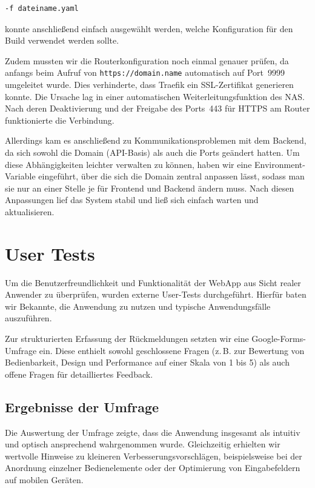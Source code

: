 \documentclass[oneside]{ausarbeitung}
\begin{document}
\begin{verbatim}
-f dateiname.yaml
\end{verbatim}

konnte anschließend einfach ausgewählt werden, welche Konfiguration für den Build verwendet werden sollte.

Zudem mussten wir die Routerkonfiguration noch einmal genauer prüfen, da anfangs beim Aufruf von \texttt{https://domain.name} automatisch auf Port~9999 umgeleitet wurde.  
Dies verhinderte, dass Traefik ein SSL-Zertifikat generieren konnte.  
Die Ursache lag in einer automatischen Weiterleitungsfunktion des NAS.  
Nach deren Deaktivierung und der Freigabe des Ports~443 für HTTPS am Router funktionierte die Verbindung.

Allerdings kam es anschließend zu Kommunikationsproblemen mit dem Backend, da sich sowohl die Domain (API-Basis) als auch die Ports geändert hatten.  
Um diese Abhängigkeiten leichter verwalten zu können, haben wir eine Environment-Variable eingeführt, über die sich die Domain zentral anpassen lässt, sodass man sie nur an einer Stelle je für Frontend und Backend ändern muss.  
Nach diesen Anpassungen lief das System stabil und ließ sich einfach warten und aktualisieren.

\chapter{User Tests}

Um die Benutzerfreundlichkeit und Funktionalität der WebApp aus Sicht realer Anwender zu überprüfen, wurden externe User-Tests durchgeführt.  
Hierfür baten wir Bekannte, die Anwendung zu nutzen und typische Anwendungsfälle auszuführen.  

Zur strukturierten Erfassung der Rückmeldungen setzten wir eine Google-Forms-Umfrage ein.  
Diese enthielt sowohl geschlossene Fragen (z.\,B. zur Bewertung von Bedienbarkeit, Design und Performance auf einer Skala von 1 bis 5) als auch offene Fragen für detailliertes Feedback.  

\section{Ergebnisse der Umfrage}

Die Auswertung der Umfrage zeigte, dass die Anwendung insgesamt als intuitiv und optisch ansprechend wahrgenommen wurde.  
Gleichzeitig erhielten wir wertvolle Hinweise zu kleineren Verbesserungsvorschlägen, beispielsweise bei der Anordnung einzelner Bedienelemente oder der Optimierung von Eingabefeldern auf mobilen Geräten.  
\end{document}
